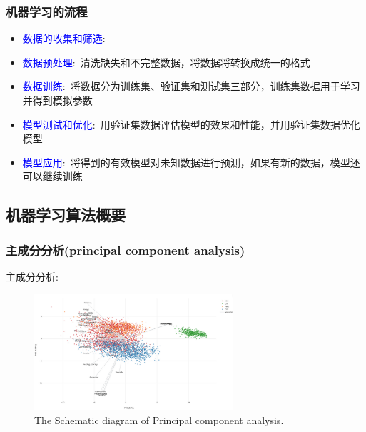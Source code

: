 {{\frame
{
	\frametitle{机器学习的流程}
\begin{itemize}
	\item \textcolor{blue}{数据的收集和筛选}:~{\fontsize{8.0pt}{4.2pt}\selectfont{从现有数据中产生并选择与问题解决有用和相关的数据子集}}
	\item \textcolor{blue}{数据预处理}:~清洗缺失和不完整数据，将数据将转换成统一的格式{\fontsize{8.0pt}{4.2pt}\selectfont{(如整型、字符串型等)}}%
	\item \textcolor{blue}{数据训练}:~将数据分为训练集、验证集和测试集三部分，训练集数据用于学习并得到模拟参数{\fontsize{8.0pt}{4.2pt}\selectfont{(主要针对监督学习)}}
	\item \textcolor{blue}{模型测试和优化}:~用验证集数据评估模型的效果和性能，并用验证集数据优化模型
		\vskip 3pt
		{\fontsize{8.0pt}{4.2pt}\selectfont{一旦完成优化，用测试集数据评定模型的性能}}%
	\item \textcolor{blue}{模型应用}:~将得到的有效模型对未知数据进行预测，如果有新的数据，模型还可以继续训练
\end{itemize}
}

\subsection{机器学习算法概要}
\frame
{
	\frametitle{主成分分析\textrm{(principal component analysis)}}
	主成分分析:\\
	{\fontsize{8.0pt}{4.2pt}\selectfont{\textcolor{blue}{将高维数据投影到数据点集中的区域，并使数据在新轴向周围聚集度最高}}}
{\fontsize{8.0pt}{4.2pt}}
\begin{figure}[h!]
\centering
\vspace*{-0.1in}
\includegraphics[height=1.70in,width=2.9in,viewport=0 0 1040 620,clip]{Figures/ML_PCM.png}
\caption{\tiny{\textrm{The Schematic diagram of Principal component analysis.}}}%
\label{ML_PCM}
\end{figure}
}

}}
